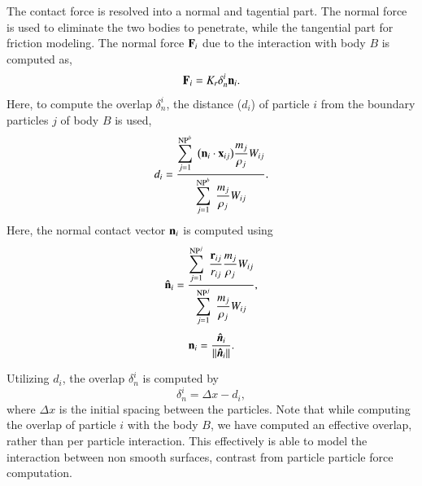 The contact force is resolved into a normal and tagential part. The normal force
is used to eliminate the two bodies to penetrate, while the tangential part for
friction modeling. The normal force $\mathbf{F}_i$ due to the interaction with body
$B$ is computed as,
\begin{equation}
  \label{eq:contact-algorithm-normal}
  \mathbf{F}_i = K_r \delta_{n}^{i} \mathbf{n}_i.
\end{equation}
Here, to compute the overlap $\delta_{n}^{i}$, the distance ($d_i$) of particle $i$
from the boundary particles $j$ of body $B$ is used,
\begin{equation}
  \label{eq:cf-distance-computation}
  d_i = \frac{
    \displaystyle\sum\limits_{j = 1}^{\text{NP}^{b}} \;
    \big( \mathbf{n}_i \cdot \mathbf{x}_{ij} \big)  \frac{m_j}{\rho_j} W_{ij}}
  {
    \displaystyle\sum\limits_{j = 1}^{\text{NP}^{b}} \;
    \frac{m_j}{\rho_j} W_{ij}}.
\end{equation}
Here, the normal contact vector $\mathbf{n}_i$ is computed using
\begin{equation}
  \label{eq:cf-normal-vector}
  \mathbf{\hat{n}}_i = \frac{
    \displaystyle\sum\limits_{j = 1}^{\text{NP}^{j}} \;
    \frac{\mathbf{r}_{ij}}{r_{ij}}  \frac{m_j}{\rho_j} W_{ij}}
  {
    \displaystyle\sum\limits_{j = 1}^{\text{NP}^{j}} \;
    \frac{m_j}{\rho_j} W_{ij}},
\end{equation}
\begin{equation}
  \label{eq:cf-normal-vector}
  \mathbf{n}_i = \frac{\boldsymbol{\hat{n}}_i}{||\boldsymbol{\hat{n}}_i||}.
\end{equation}

Utilizing $d_i$, the overlap $\delta_{n}^{i}$ is computed by
\begin{equation}
  \label{eq:cf-overlap}
  \delta_{n}^{i} = \Delta x - d_i,
\end{equation}
where $\Delta x$ is the initial spacing between the particles. Note that while
computing the overlap of particle $i$ with the body $B$, we have computed an
effective overlap, rather than per particle interaction. This effectively is
able to model the interaction between non smooth surfaces, contrast from
particle particle force computation.


